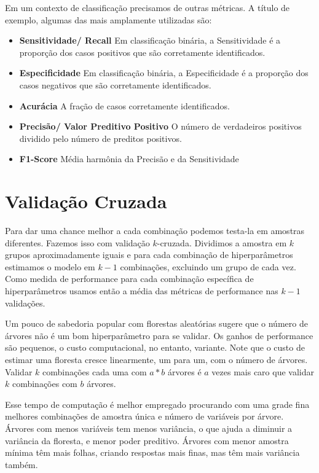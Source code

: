Em um contexto de classificação precisamos de outras métricas. A título de exemplo, algumas das mais amplamente utilizadas são:

\begin{itemize}
    \item \textbf{Sensitividade/ Recall} \newline
    Em classificação binária, a Sensitividade é a proporção dos casos positivos que são corretamente identificados.
    \item \textbf{Especificidade} \newline
    Em classificação binária, a Especificidade é a proporção dos casos negativos que são corretamente identificados.
    \item \textbf{Acurácia} \newline
    A fração de casos corretamente identificados. 
    \item \textbf{Precisão/ Valor Preditivo Positivo} \newline
    O número de verdadeiros positivos dividido pelo número de preditos positivos.
    \item \textbf{F1-Score} \newline
    Média harmônia da Precisão e da Sensitividade
\end{itemize}


\section{Validação Cruzada}

Para dar uma chance melhor a cada combinação podemos testa-la em amostras diferentes. Fazemos isso com validação $k$-cruzada. Dividimos a amostra em $k$ grupos aproximadamente iguais e para cada combinação de hiperparâmetros estimamos o modelo em $k-1$ combinações, excluindo um grupo de cada vez. Como medida de performance para cada combinação específica de hiperparâmetros usamos então a média das métricas de performance nas $k-1$ validações. 

Um pouco de sabedoria popular com florestas aleatórias sugere que o número de árvores não é um bom hiperparâmetro para se validar. Os ganhos de performance são pequenos, o custo computacional, no entanto, variante. Note que o custo de estimar uma floresta cresce linearmente, um para um, com o número de árvores. Validar $k$ combinações cada uma com $a*b$ árvores é $a$ vezes mais caro que validar $k$ combinações com $b$ árvores. 

Esse tempo de computação é melhor empregado procurando com uma grade fina melhores combinações de amostra única e número de variáveis por árvore. Árvores com menos variáveis tem menos variância, o que ajuda a diminuir a variância da floresta, e menor poder preditivo. Árvores com menor amostra mínima têm mais folhas, criando respostas mais finas, mas têm mais variância também. 


